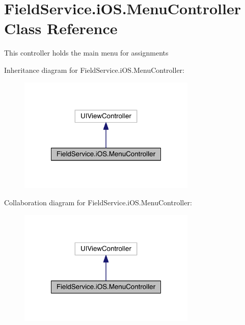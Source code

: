 \hypertarget{class_field_service_1_1i_o_s_1_1_menu_controller}{\section{Field\+Service.\+i\+O\+S.\+Menu\+Controller Class Reference}
\label{class_field_service_1_1i_o_s_1_1_menu_controller}
}


This controller holds the main menu for assignments  




Inheritance diagram for Field\+Service.\+i\+O\+S.\+Menu\+Controller\+:
\nopagebreak
\begin{figure}[H]
\begin{center}
\leavevmode
\includegraphics[width=240pt]{class_field_service_1_1i_o_s_1_1_menu_controller__inherit__graph}
\end{center}
\end{figure}


Collaboration diagram for Field\+Service.\+i\+O\+S.\+Menu\+Controller\+:
\nopagebreak
\begin{figure}[H]
\begin{center}
\leavevmode
\includegraphics[width=240pt]{class_field_service_1_1i_o_s_1_1_menu_controller__coll__graph}
\end{center}
\end{figure}
